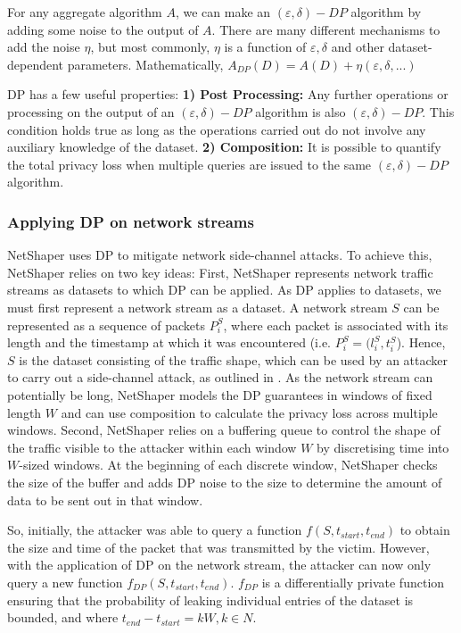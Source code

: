 For any aggregate algorithm $A$, we can make an $(\varepsilon, \delta)-DP$ algorithm by adding some noise to the output of $A$.
There are many different mechanisms to add the noise $\eta$, but most commonly, $\eta$ is a function of $\varepsilon, \delta$ and other dataset-dependent parameters. 
Mathematically, $A_{DP}(D) = A(D) + \eta(\varepsilon, \delta, ...)$

DP has a few useful properties: 
\textbf{1) Post Processing:} Any further operations or processing on the output of an $(\varepsilon, \delta)-DP$ algorithm is also $(\varepsilon, \delta)-DP$.
This condition holds true as long as the operations carried out do not involve any auxiliary knowledge of the dataset.
\textbf{2) Composition:} It is possible to quantify the total privacy loss when multiple queries are issued to the same $(\varepsilon, \delta)-DP$ algorithm.

\subsubsection{Applying DP on network streams}
\label{subsubsec:netshaper-background-framework-applying-dp}
NetShaper uses DP to mitigate network side-channel attacks. 
To achieve this, NetShaper relies on two key ideas: 
First, NetShaper represents network traffic streams as datasets to which DP can be applied.
As DP applies to datasets, we must first represent a network stream as a dataset.
A network stream $S$ can be represented as a sequence of packets $P_i^S$, where each packet is associated with its length and the timestamp at which it was encountered (i.e. $P_i^S = (l_i^S, t_i^S$).
Hence, $S$ is the dataset consisting of the traffic shape, which can be used by an attacker to carry out a side-channel attack, as outlined in .
As the network stream can potentially be long, NetShaper models the DP guarantees in windows of fixed length $W$ and can use composition to calculate the privacy loss across multiple windows.
Second, NetShaper relies on a buffering queue to control the shape of the traffic visible to the attacker within each window $W$ by discretising time into $W$-sized windows.
At the beginning of each discrete window, NetShaper checks the size of the buffer and adds DP noise to the size to determine the amount of data to be sent out in that window.


So, initially, the attacker was able to query a function $f(S, t_{start}, t_{end})$ to obtain the size and time of the packet that was transmitted by the victim. 
However, with the application of DP on the network stream, the attacker can now only query a new function $f_{DP}(S, t_{start}, t_{end})$.
$f_{DP}$ is a differentially private function ensuring that the probability of leaking individual entries of the dataset is bounded, and where $t_{end} - t_{start} = kW, k \in N$.

\endinput

Note: Should we add stuff about sensitivity? (I don't think it's necessary for my thesis)